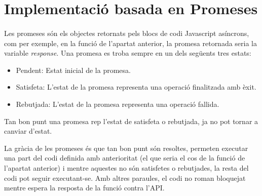 \section{Implementació basada en Promeses}

    \paragraph{}
    Les promeses són els objectes retornats pels blocs de codi Javascript asíncrons, com per exemple, en la funció de l’apartat anterior, la promesa retornada seria la variable \emph{response}. Una promesa es troba sempre en un dels següents tres estats:

    \begin{itemize}
        \item Pendent: Estat inicial de la promesa.
        \item Satisfeta: L'estat de la promesa representa una operació finalitzada amb èxit.
        \item Rebutjada: L'estat de la promesa representa una operació fallida.
    \end{itemize}

    Tan bon punt una promesa rep l'estat de satisfeta o rebutjada, ja no pot tornar a canviar d'estat.

    La gràcia de les promeses és que tan bon punt són resoltes, permeten executar una part del codi definida amb anterioritat (el que seria el cos de la funció de l'apartat anterior) i mentre aquestes no són satisfetes o rebutjades, la resta del codi pot seguir executant-se. Amb altres paraules, el codi no roman bloquejat mentre espera la resposta de la funció contra l’API.
